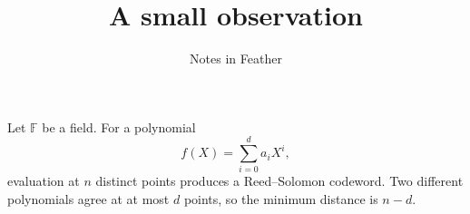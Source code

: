 \documentclass{article}
\title{A small observation}
\author{Notes in Feather}
\date{}
\begin{document}
\maketitle
Let $\mathbb{F}$ be a field. For a polynomial
\[
f(X) = \sum_{i=0}^{d} a_i X^i,
\]
evaluation at $n$ distinct points produces a Reed--Solomon codeword.
Two different polynomials agree at at most $d$ points, so the minimum distance is $n-d$.
\end{document}
